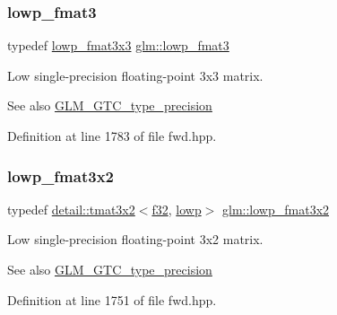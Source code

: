 \subsubsection{\texorpdfstring{lowp\+\_\+fmat3}{lowp\_fmat3}}
{\footnotesize\ttfamily typedef \hyperlink{group__gtc__type__precision_ga25b389b52269f3256f015b4fff5789c2}{lowp\+\_\+fmat3x3} \hyperlink{group__gtc__type__precision_ga88ae00cab6aae48d56700915c7799973}{glm\+::lowp\+\_\+fmat3}}

Low single-\/precision floating-\/point 3x3 matrix. \begin{DoxySeeAlso}{See also}
\hyperlink{group__gtc__type__precision}{G\+L\+M\+\_\+\+G\+T\+C\+\_\+type\+\_\+precision} 
\end{DoxySeeAlso}


Definition at line 1783 of file fwd.\+hpp.

\mbox{\label{group__gtc__type__precision_ga6e03c9a11f7d781af7549ce566844cc6}} 
\subsubsection{\texorpdfstring{lowp\+\_\+fmat3x2}{lowp\_fmat3x2}}
{\footnotesize\ttfamily typedef \hyperlink{structglm_1_1detail_1_1tmat3x2}{detail\+::tmat3x2}$<$\hyperlink{group__gtc__type__precision_ga0ec999b57f5330d9021256e96038df04}{f32}, \hyperlink{namespaceglm_a0f04f086094c747d227af4425893f545ae161af3fc695e696ce3bf69f7332bc2d}{lowp}$>$ \hyperlink{group__gtc__type__precision_ga6e03c9a11f7d781af7549ce566844cc6}{glm\+::lowp\+\_\+fmat3x2}}

Low single-\/precision floating-\/point 3x2 matrix. \begin{DoxySeeAlso}{See also}
\hyperlink{group__gtc__type__precision}{G\+L\+M\+\_\+\+G\+T\+C\+\_\+type\+\_\+precision} 
\end{DoxySeeAlso}


Definition at line 1751 of file fwd.\+hpp.

\mbox{\label{group__gtc__type__precision_ga25b389b52269f3256f015b4fff5789c2}} 
